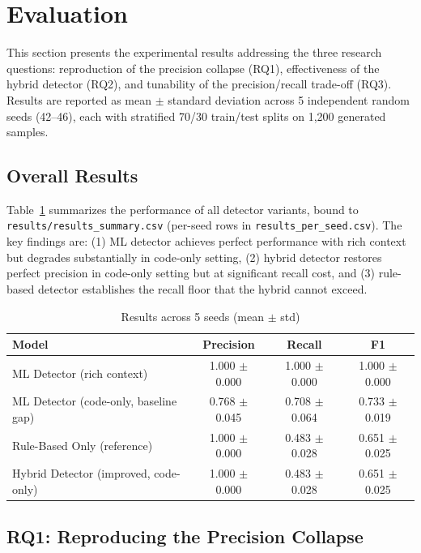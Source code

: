 
\section{Evaluation}
\label{sec:Evaluation}

This section presents the experimental results addressing the three research questions: reproduction of the precision collapse (RQ1), effectiveness of the hybrid detector (RQ2), and tunability of the precision/recall trade-off (RQ3). Results are reported as mean $\pm$ standard deviation across 5 independent random seeds (42--46), each with stratified 70/30 train/test splits on 1,200 generated samples.

\subsection{Overall Results}

Table~\ref{tab:results} summarizes the performance of all detector variants, bound to \texttt{results/results\_summary.csv} (per-seed rows in \texttt{results\_per\_seed.csv}). The key findings are: (1) ML detector achieves perfect performance with rich context but degrades substantially in code-only setting, (2) hybrid detector restores perfect precision in code-only setting but at significant recall cost, and (3) rule-based detector establishes the recall floor that the hybrid cannot exceed.

\begin{table}[htp]
\centering
\caption{Results across 5 seeds (mean $\pm$ std)}
\label{tab:results}
\begin{tabular}{lccc}
\hline
Model & Precision & Recall & F1 \\
\hline
ML Detector (rich context) & 1.000 $\pm$ 0.000 & 1.000 $\pm$ 0.000 & 1.000 $\pm$ 0.000 \\
ML Detector (code-only, baseline gap) & 0.768 $\pm$ 0.045 & 0.708 $\pm$ 0.064 & 0.733 $\pm$ 0.019 \\
Rule-Based Only (reference) & 1.000 $\pm$ 0.000 & 0.483 $\pm$ 0.028 & 0.651 $\pm$ 0.025 \\
Hybrid Detector (improved, code-only) & 1.000 $\pm$ 0.000 & 0.483 $\pm$ 0.028 & 0.651 $\pm$ 0.025 \\
\hline
\end{tabular}
\end{table}

\subsection{RQ1: Reproducing the Precision Collapse}
\label{sec:evalOne}

